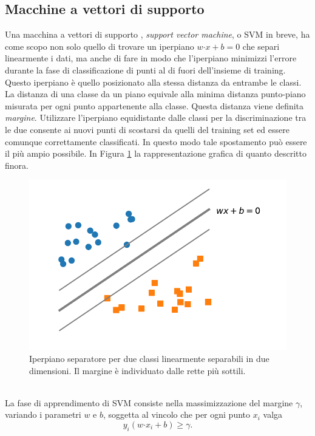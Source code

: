 \documentclass [11pt,a4paper,twoside,openright] {book}
\begin{document}
\subsection{Macchine a vettori di supporto}
Una macchina a vettori di supporto \cite{cortes1995support}, \textit{support vector machine}, o SVM in breve, ha come scopo non solo quello di trovare un iperpiano $w \boldsymbol{\cdot} x + b = 0$ che separi linearmente i dati, ma anche di fare in modo che l'iperpiano minimizzi l'errore durante la fase di classificazione di punti al di fuori dell'insieme di training. Questo iperpiano è quello posizionato alla stessa distanza da entrambe le classi. La distanza di una classe da un piano equivale alla minima distanza punto-piano misurata per ogni punto appartenente alla classe. Questa distanza viene definita \textit{margine}. Utilizzare l'iperpiano equidistante dalle classi per la discriminazione tra le due consente ai nuovi punti di scostarsi da quelli del training set ed essere comunque correttamente classificati. In questo modo tale spostamento può essere il più ampio possibile. In Figura \ref{margine} la rappresentazione grafica di quanto descritto finora.
\begin{figure}[!h]
\centering
\includegraphics[scale=.6]{figure/margine.pdf}
\caption{Iperpiano separatore per due classi linearmente separabili in due dimensioni. Il margine è individuato dalle rette più sottili.\label{margine}}
\end{figure}\\
La fase di apprendimento di SVM consiste nella massimizzazione del margine $\gamma$, variando i parametri $w$ e $b$, soggetta al vincolo che per ogni punto $x_i$ valga
\begin{equation}
y_i(w\boldsymbol{\cdot}x_i + b) \geq \gamma.
\end{equation}
\end{document}
